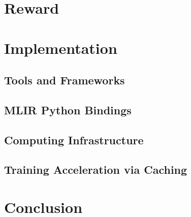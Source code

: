 \section{Reward}

\section{Implementation}
\subsection{Tools and Frameworks}
\subsection{MLIR Python Bindings}
\subsection{Computing Infrastructure}
\subsection{Training Acceleration via Caching}

\section{Conclusion}